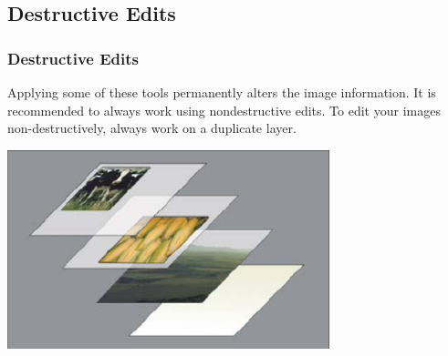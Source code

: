 \documentclass{beamer}
\begin{document}
			\subsection{Destructive Edits}		
			\begin{frame}
				\frametitle{Destructive Edits}
				\begin{outline}
					\1 Applying some of these tools permanently alters the image information.
					\1 It is recommended to always work using nondestructive edits.
					\1 To edit your images non-destructively, always work on a duplicate layer. 
				\end{outline}
				\begin{center}
					\includegraphics[width=0.7\textwidth]{images/layers example.png}
				\end{center}	
			\end{frame}
	
\end{document}

